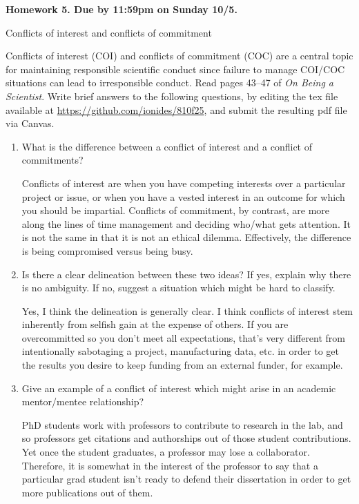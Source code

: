\documentclass[12pt]{article}
\begin{document}
\begin{center}\bf
Homework 5. Due by 11:59pm on Sunday 10/5.

Conflicts of interest and conflicts of commitment

\end{center}
Conflicts of interest (COI) and conflicts of commitment (COC) are a central topic for maintaining responsible scientific conduct since failure to manage COI/COC situations can lead to irresponsible conduct. Read pages 43--47 of {\em On Being a Scientist}. Write brief answers to the following questions, by editing the tex file available at \url{https://github.com/ionides/810f25}, and submit the resulting pdf file via Canvas.

\begin{enumerate}

\item What is the difference between a conflict of interest and a conflict of commitments? 

Conflicts of interest are when you have competing interests over a particular project or issue, or when you have a vested interest in an outcome for which you should be impartial. Conflicts of commitment, by contrast, are more along the lines of time management and deciding who/what gets attention. It is not the same in that it is not an ethical dilemma. Effectively, the difference is being compromised versus being busy.

\item Is there a clear delineation between these two ideas? If yes, explain why there is no ambiguity. If no, suggest a situation which might be hard to classify.

Yes, I think the delineation is generally clear. I think conflicts of interest stem inherently from selfish gain at the expense of others. If you are overcommitted so you don't meet all expectations, that's very different from intentionally sabotaging a project, manufacturing data, etc. in order to get the results you desire to keep funding from an external funder, for example.

\item Give an example of a conflict of interest which might arise in an academic mentor/mentee relationship?

PhD students work with professors to contribute to research in the lab, and so professors get 
citations and authorships out of those student contributions. Yet once the student graduates, a
professor may lose a collaborator. Therefore, it is somewhat in the interest of the professor to
say that a particular grad student isn't ready to defend their dissertation in order to get more 
publications out of them.


\end{enumerate}
\end{document}
